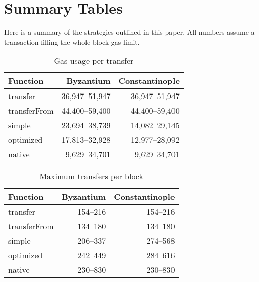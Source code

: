 \documentclass[12pt]{article}
\begin{document}
\section{Summary Tables}

Here is a summary of the strategies outlined in this paper. All numbers assume a transaction filling the whole block gas limit.

\begin{table}[h]
	\caption{Gas usage per transfer}
	\begin{center}
	\begin{tabular}{l r r}
		Function & Byzantium & Constantinople \\ \hline
		transfer & 36,947--51,947 & 36,947--51,947 \\
		transferFrom & 44,400--59,400 & 44,400--59,400 \\
		simple & 23,694--38,739 & 14,082--29,145 \\
		optimized & 17,813--32,928 & 12,977--28,092 \\
		native & 9,629--34,701 & 9,629--34,701 \\
	\end{tabular}
	\end{center}
\end{table}
%
\begin{table}[h]
	\caption{Maximum transfers per block}
	\begin{center}
	\begin{tabular}{l r r}
		Function & Byzantium & Constantinople \\ \hline
		transfer & 154--216 & 154--216 \\
		transferFrom & 134--180 & 134--180 \\
		simple & 206--337 & 274--568 \\
		optimized & 242--449 & 284--616 \\	
		native & 230--830 & 230--830 \\
	\end{tabular}
	\end{center}
\end{table}
\end{document}
